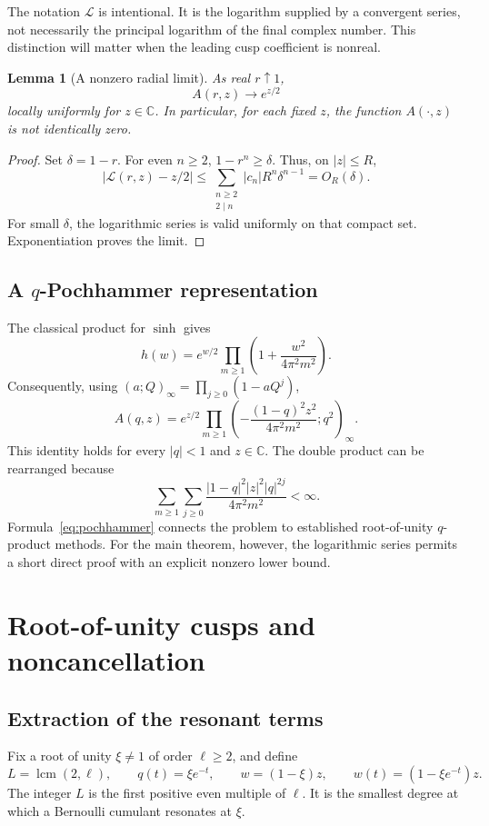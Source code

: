 \documentclass[11pt,a4paper]{article}
\numberwithin{equation}{section}
\newtheorem{lemma}[theorem]{Lemma}
\theoremstyle{definition}
\theoremstyle{remark}
\newcommand{\C}{\mathbb C}
\newcommand{\lcm}{\operatorname{lcm}}
\newcommand{\LL}{\mathcal L}
\begin{document}
The notation \(\LL\) is intentional. It is the logarithm supplied by a convergent series, not necessarily the principal logarithm of the final complex number. This distinction will matter when the leading cusp coefficient is nonreal.

\begin{lemma}[A nonzero radial limit]\label{lem:qone-limit}
As real \(r\uparrow1\),
\begin{equation}\label{eq:qone-limit}
 A(r,z)\longrightarrow e^{z/2}
\end{equation}
locally uniformly for \(z\in\C\). In particular, for each fixed \(z\), the function \(A(\cdot,z)\) is not identically zero.
\end{lemma}
\begin{proof}
Set \(\delta=1-r\). For even \(n\ge2\), \(1-r^n\ge\delta\). Thus, on \(|z|\le R\),
\[
 \left|\LL(r,z)-z/2\right|
 \le\sum_{\substack{n\ge2\\2\mid n}}|c_n|R^n\delta^{n-1}
 =O_R(\delta).
\]
For small \(\delta\), the logarithmic series is valid uniformly on that compact set. Exponentiation proves the limit.
\end{proof}

\subsection{A \texorpdfstring{\(q\)}{q}-Pochhammer representation}
The classical product for \(\sinh\) gives \cite[\S4.36]{dlmf}
\[
 h(w)=e^{w/2}\prod_{m\ge1}\left(1+\frac{w^2}{4\pi^2m^2}\right).
\]
Consequently, using \((a;Q)_\infty=\prod_{j\ge0}(1-aQ^j)\),
\begin{equation}\label{eq:pochhammer}
 A(q,z)=e^{z/2}\prod_{m\ge1}
 \left(-\frac{(1-q)^2z^2}{4\pi^2m^2};q^2\right)_\infty.
\end{equation}
This identity holds for every \(|q|<1\) and \(z\in\C\). The double product can be rearranged because
\[
 \sum_{m\ge1}\sum_{j\ge0}
 \frac{|1-q|^2|z|^2|q|^{2j}}{4\pi^2m^2}<\infty.
\]
Formula~\eqref{eq:pochhammer} connects the problem to established root-of-unity \(q\)-product methods. For the main theorem, however, the logarithmic series permits a short direct proof with an explicit nonzero lower bound.

\section{Root-of-unity cusps and noncancellation}
\subsection{Extraction of the resonant terms}
Fix a root of unity \(\xi\ne1\) of order \(\ell\ge2\), and define
\begin{equation}\label{eq:root-notation}
 L=\lcm(2,\ell),\qquad q(t)=\xi e^{-t},\qquad
 w=(1-\xi)z,\qquad w(t)=(1-\xi e^{-t})z.
\end{equation}
The integer \(L\) is the first positive even multiple of \(\ell\). It is the smallest degree at which a Bernoulli cumulant resonates at \(\xi\).
\end{document}
